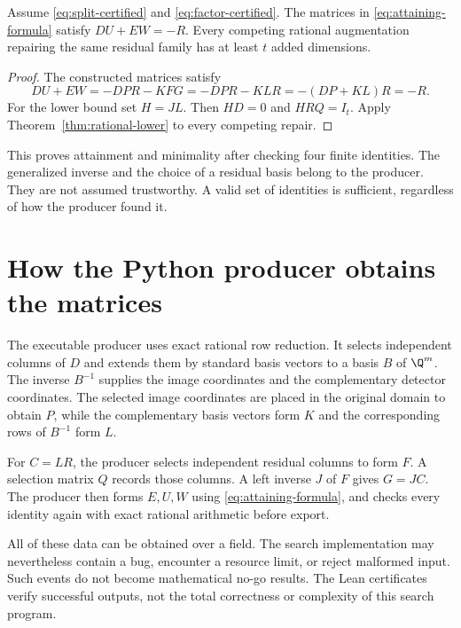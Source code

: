 \begin{theorem}\label{thm:matrix-attainment}
Assume \eqref{eq:split-certified} and \eqref{eq:factor-certified}. The matrices in \eqref{eq:attaining-formula} satisfy $DU+EW=-R$. Every competing rational augmentation repairing the same residual family has at least $t$ added dimensions.
\end{theorem}
\begin{proof}
The constructed matrices satisfy
\[
 DU+EW=-DPR-KFG=-DPR-KLR=-(DP+KL)R=-R.
\]
For the lower bound set $H=JL$. Then $HD=0$ and $HRQ=I_t$. Apply Theorem~\ref{thm:rational-lower} to every competing repair.
\end{proof}

This proves attainment and minimality after checking four finite identities. The generalized inverse and the choice of a residual basis belong to the producer. They are not assumed trustworthy. A valid set of identities is sufficient, regardless of how the producer found it.

\section{How the Python producer obtains the matrices}
The executable producer uses exact rational row reduction. It selects independent columns of $D$ and extends them by standard basis vectors to a basis $B$ of $\Q^m$. The inverse $B^{-1}$ supplies the image coordinates and the complementary detector coordinates. The selected image coordinates are placed in the original domain to obtain $P$, while the complementary basis vectors form $K$ and the corresponding rows of $B^{-1}$ form $L$.

For $C=LR$, the producer selects independent residual columns to form $F$. A selection matrix $Q$ records those columns. A left inverse $J$ of $F$ gives $G=JC$. The producer then forms $E,U,W$ using \eqref{eq:attaining-formula}, and checks every identity again with exact rational arithmetic before export.

All of these data can be obtained over a field. The search implementation may nevertheless contain a bug, encounter a resource limit, or reject malformed input. Such events do not become mathematical no-go results. The Lean certificates verify successful outputs, not the total correctness or complexity of this search program.

